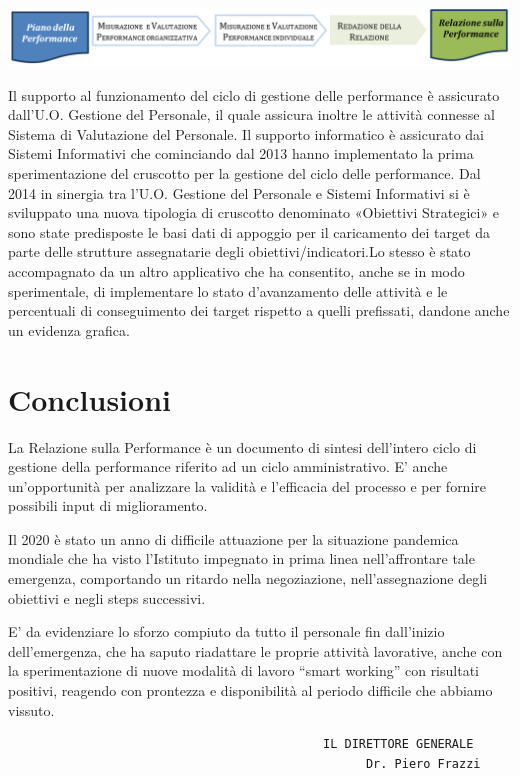 \documentclass[
  12pt,
]{article}
\begin{document}
\begin{center}\includegraphics[width=0.9\linewidth]{figure/f7} \end{center}

Il supporto al funzionamento del ciclo di gestione delle performance è
assicurato dall'U.O. Gestione del Personale, il quale assicura inoltre
le attività connesse al Sistema di Valutazione del Personale. Il
supporto informatico è assicurato dai Sistemi Informativi che
cominciando dal 2013 hanno implementato la prima sperimentazione del
cruscotto per la gestione del ciclo delle performance. Dal 2014 in
sinergia tra l'U.O. Gestione del Personale e Sistemi Informativi si è
sviluppato una nuova tipologia di cruscotto denominato «Obiettivi
Strategici» e sono state predisposte le basi dati di appoggio per il
caricamento dei target da parte delle strutture assegnatarie degli
obiettivi/indicatori.Lo stesso è stato accompagnato da un altro
applicativo che ha consentito, anche se in modo sperimentale, di
implementare lo stato d'avanzamento delle attività e le percentuali di
conseguimento dei target rispetto a quelli prefissati, dandone anche un
evidenza grafica.

\hypertarget{conclusioni}{%
\section{Conclusioni}\label{conclusioni}}

La Relazione sulla Performance è un documento di sintesi dell'intero
ciclo di gestione della performance riferito ad un ciclo amministrativo.
E' anche un'opportunità per analizzare la validità e l'efficacia del
processo e per fornire possibili input di miglioramento.

Il 2020 è stato un anno di difficile attuazione per la situazione
pandemica mondiale che ha visto l'Istituto impegnato in prima linea
nell'affrontare tale emergenza, comportando un ritardo nella
negoziazione, nell'assegnazione degli obiettivi e negli steps
successivi.

E' da evidenziare lo sforzo compiuto da tutto il personale fin
dall'inizio dell'emergenza, che ha saputo riadattare le proprie attività
lavorative, anche con la sperimentazione di nuove modalità di lavoro
``smart working'' con risultati positivi, reagendo con prontezza e
disponibilità al periodo difficile che abbiamo vissuto.

\begin{verbatim}
                                            IL DIRETTORE GENERALE
                                                  Dr. Piero Frazzi
\end{verbatim}
\end{document}
